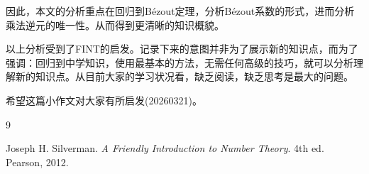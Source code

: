 \documentclass[12pt,a4paper]{ctexart}
\theoremstyle{plain}
\theoremstyle{definition}
\theoremstyle{remark}
\begin{document}
因此，本文的分析重点在回归到B\'ezout定理，分析B\'ezout系数的形式，进而分析乘法逆元的唯一性。从而得到更清晰的知识概貌。

以上分析受到了FINT\cite{fint}的启发。记录下来的意图并非为了展示新的知识点，而为了强调：回归到中学知识，使用最基本的方法，无需任何高级的技巧，就可以分析理解新的知识点。从目前大家的学习状况看，缺乏阅读，缺乏思考是最大的问题。

希望这篇小作文对大家有所启发(20260321)。

\begin{thebibliography}{9}

Joseph H. Silverman.
\newblock \emph{A Friendly Introduction to Number Theory}.
\newblock 4th ed.
\newblock Pearson, 2012.

\end{thebibliography}
\end{document}

